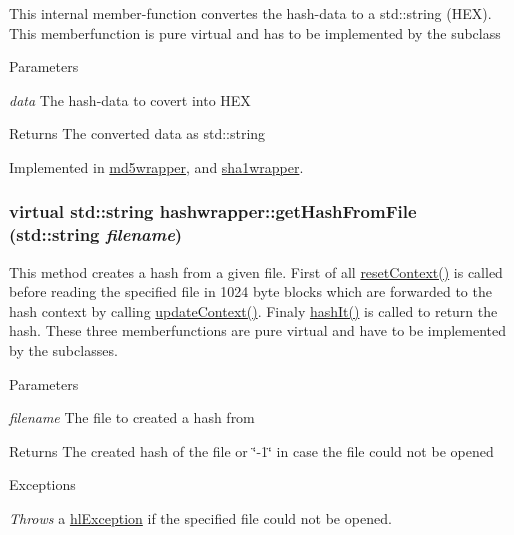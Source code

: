 This internal member-\/function convertes the hash-\/data to a std::string (HEX). This memberfunction is pure virtual and has to be implemented by the subclass


\begin{DoxyParams}{Parameters}
\item[{\em data}]The hash-\/data to covert into HEX \end{DoxyParams}
\begin{DoxyReturn}{Returns}
The converted data as std::string 
\end{DoxyReturn}


Implemented in \hyperlink{classmd5wrapper_a4b2bd3d8cb53e4f24d843b1c17089c9c}{md5wrapper}, and \hyperlink{classsha1wrapper_a1339f960e306c6bde056191d66001152}{sha1wrapper}.\hypertarget{classhashwrapper_ae4767e76e6d9e2b24b41f01ab9e7f03c}{
\subsubsection[{getHashFromFile}]{\setlength{\rightskip}{0pt plus 5cm}virtual std::string hashwrapper::getHashFromFile (std::string {\em filename})}}
\label{classhashwrapper_ae4767e76e6d9e2b24b41f01ab9e7f03c}


This method creates a hash from a given file. First of all \hyperlink{classhashwrapper_aa7d46e9630a794ff08cfb5307660a86d}{resetContext()} is called before reading the specified file in 1024 byte blocks which are forwarded to the hash context by calling \hyperlink{classhashwrapper_a7fe42ccf310e7d2cfe95f61732b73197}{updateContext()}. Finaly \hyperlink{classhashwrapper_a53f97c06885ed2b1fa255759a957a782}{hashIt()} is called to return the hash. These three memberfunctions are pure virtual and have to be implemented by the subclasses.


\begin{DoxyParams}{Parameters}
\item[{\em filename}]The file to created a hash from\end{DoxyParams}
\begin{DoxyReturn}{Returns}
The created hash of the file or \char`\"{}-\/1\char`\"{} in case the file could not be opened 
\end{DoxyReturn}

\begin{DoxyExceptions}{Exceptions}
\item[{\em Throws}]a \hyperlink{classhl_exception}{hlException} if the specified file could not be opened. \end{DoxyExceptions}


